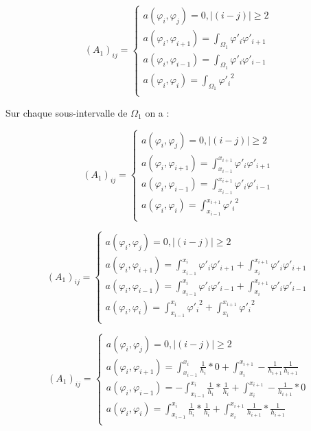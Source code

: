 \documentclass[12pt]{article}
\begin{document}
$$
(A_{1})_{ij} = 
\begin{cases}
a(\varphi_{i},\varphi_{j}) = 0 ,    |(i-j)| \ge 2 \\
a(\varphi_{i},\varphi_{i+1}) =  \int_{\Omega_{1}} \varphi'_{i} \varphi'_{i+1} \\
a(\varphi_{i},\varphi_{i-1}) = \int_{\Omega_{1}} \varphi'_{i} \varphi'_{i-1}  \\
a(\varphi_{i},\varphi_{i}) = \int_{\Omega_{1}}  {\varphi'_{i}}^2   \\
\end{cases}
$$


Sur chaque sous-intervalle de $ \Omega_{1}$ on a :

$$
(A_{1})_{ij} = 
\begin{cases}
a(\varphi_{i},\varphi_{j}) = 0 ,    |(i-j)| \ge 2 \\
a(\varphi_{i},\varphi_{i+1}) = \int_{x_{i-1}}^{x_{i+1}} \varphi'_{i} \varphi'_{i+1} \\
a(\varphi_{i},\varphi_{i-1}) = \int_{x_{i-1}}^{x_{i+1}} \varphi'_{i} \varphi'_{i-1}  \\
a(\varphi_{i},\varphi_{i}) = \int_{x_{i-1}}^{x_{i+1}}  {\varphi'_{i}}^2   \\
\end{cases}
$$

$$
(A_{1})_{ij} = 
\begin{cases}
a(\varphi_{i},\varphi_{j}) = 0 ,    |(i-j)| \ge 2 \\
a(\varphi_{i},\varphi_{i+1}) = 
\int_{x_{i-1}}^{x_{i}} \varphi'_{i} \varphi'_{i+1} + \int_{x_{i}}^{x_{i+1}} \varphi'_{i} \varphi'_{i+1}  \\
a(\varphi_{i},\varphi_{i-1}) = 
\int_{x_{i-1}}^{x_{i}} \varphi'_{i} \varphi'_{i-1} + \int_{x_{i}}^{x_{i+1}} \varphi'_{i} \varphi'_{i-1}  \\
a(\varphi_{i},\varphi_{i}) = 
\int_{x_{i-1}}^{x_{i}}  {\varphi'_{i}}^2 +  \int_{x_{i}}^{x_{i+1}}  {\varphi'_{i}}^2\\
\end{cases}
$$


$$
(A_{1})_{ij} = 
\begin{cases}
a(\varphi_{i},\varphi_{j}) = 0 ,    |(i-j)| \ge 2 \\
a(\varphi_{i},\varphi_{i+1}) = 
\int_{x_{i-1}}^{x_{i}} \frac{1}{h_{i}} *0 + \int_{x_{i}}^{x_{i+1}} -\frac{1}{h_{i+1}}\frac{1}{h_{i+1}}  \\
a(\varphi_{i},\varphi_{i-1}) = 
-\int_{x_{i-1}}^{x_{i}} \frac{1}{h_{i}} *\frac{1}{h_{i}} + \int_{x_{i}}^{x_{i+1}} -\frac{1}{h_{i+1}}*0  \\
a(\varphi_{i},\varphi_{i}) = 
\int_{x_{i-1}}^{x_{i}} \frac{1}{h_{i}} *\frac{1}{h_{i}} + \int_{x_{i}}^{x_{i+1}} \frac{1}{h_{i+1}} *\frac{1}{h_{i+1}} \\
\end{cases}
$$
\end{document}
